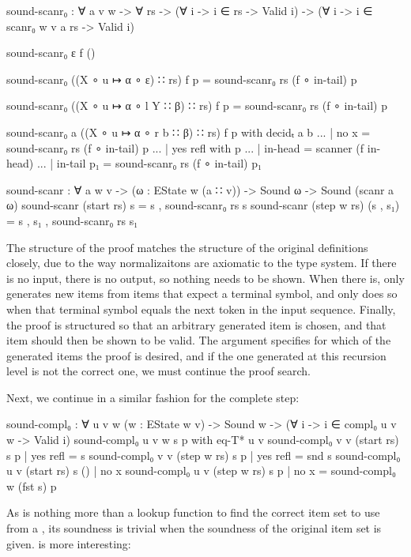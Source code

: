 		\begin{code}
			sound-scanr₀ : ∀ {a v w} -> ∀ rs ->
			  (∀ {i} -> i ∈ rs -> Valid i) ->
			  (∀ {i} -> i ∈ scanr₀ {w} {v} a rs -> Valid i)

			sound-scanr₀ ε f ()

			sound-scanr₀ ((X ∘ u ↦ α ∘ ε) ∷ rs) f p =
			  sound-scanr₀ rs (f ∘ in-tail) p

			sound-scanr₀ ((X ∘ u ↦ α ∘ l Y ∷ β) ∷ rs) f p =
			  sound-scanr₀ rs (f ∘ in-tail) p

			sound-scanr₀ {a} ((X ∘ u ↦ α ∘ r b ∷ β) ∷ rs) f p with decidₜ a b
			... | no x = sound-scanr₀ rs (f ∘ in-tail) p
			... | yes refl with p
			...            | in-head    = scanner (f in-head)
			...            | in-tail p₁ = sound-scanr₀ rs (f ∘ in-tail) p₁

			sound-scanr : ∀ {a w v} -> (ω : EState w (a ∷ v)) ->
			  Sound ω -> Sound (scanr a ω)
			sound-scanr (start rs) s = s , sound-scanr₀ rs s
			sound-scanr (step w rs) (s , s₁) = s , s₁ , sound-scanr₀ rs s₁
		\end{code}

		The structure of the proof matches the structure of the original
		definitions closely, due to the way normalizaitons are axiomatic to the
		type system. If there is no input, there is no output, so nothing needs
		to be shown. When there is,  only generates new items
		from items that expect a terminal symbol, and only does so when that
		terminal symbol equals the next token in the input sequence. Finally,
		the proof is structured so that an arbitrary generated item is chosen,
		and that item should then be shown to be valid. The argument 
		specifies for which of the generated items the proof is desired, and if
		the one generated at this recursion level is not the correct one, we
		must continue the proof search.

		Next, we continue in a similar fashion for the complete step:

		\begin{code}
			sound-compl₀ : ∀ {u v w} (w : EState w v) ->
			  Sound w -> (∀ {i} -> i ∈ compl₀ {u} {v} w -> Valid i)
			sound-compl₀ {u} {v} w s p           with eq-T* u v
			sound-compl₀ {v} {v} (start rs) s p  | yes refl = s
			sound-compl₀ {v} {v} (step w rs) s p | yes refl = snd s
			sound-compl₀ {u} {v} (start rs) s () | no x
			sound-compl₀ {u} {v} (step w rs) s p | no x = sound-compl₀ w (fst s) p
		\end{code}

		As  is nothing more than a lookup function to find
		the correct item set to use from a , its soundness is
		trivial when the soundness of the original item set is given.
		 is more interesting:

